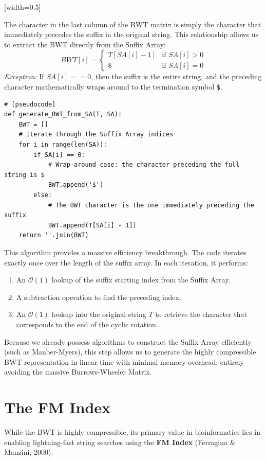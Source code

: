 [width=0.5\textwidth]

The character in the last column of the BWT matrix is simply the character that immediately precedes the suffix in the original string. This relationship allows us to extract the BWT directly from the Suffix Array:
\[
BWT[i] = 
\begin{cases} 
T[SA[i] - 1] & \text{if } SA[i] > 0 \\
\$ & \text{if } SA[i] = 0 
\end{cases}
\]
\textit{Exception:} If \( SA[i] == 0 \), then the suffix is the entire string, and the preceding character mathematically wraps around to the termination symbol \verb|$|.

\begin{verbatim}
# [pseudocode]
def generate_BWT_from_SA(T, SA):
    BWT = []
    # Iterate through the Suffix Array indices
    for i in range(len(SA)):
        if SA[i] == 0:
            # Wrap-around case: the character preceding the full string is $
            BWT.append('$')
        else:
            # The BWT character is the one immediately preceding the suffix
            BWT.append(T[SA[i] - 1])
    return ''.join(BWT)
\end{verbatim}

This algorithm provides a massive efficiency breakthrough. The code iterates exactly once over the length of the suffix array. In each iteration, it performs:
\begin{enumerate}
    \item An \( \mathcal{O}(1) \) lookup of the suffix starting index from the Suffix Array.
    \item A subtraction operation to find the preceding index.
    \item An \( \mathcal{O}(1) \) lookup into the original string \( T \) to retrieve the character that corresponds to the end of the cyclic rotation.
\end{enumerate}
Because we already possess algorithms to construct the Suffix Array efficiently (such as Manber-Myers), this step allows us to generate the highly compressible BWT representation in linear time with minimal memory overhead, entirely avoiding the massive Burrows-Wheeler Matrix.

\section{The FM Index}

While the BWT is highly compressible, its primary value in bioinformatics lies in enabling lightning-fast string searches using the \textbf{FM Index} (Ferragina \& Manzini, 2000).

